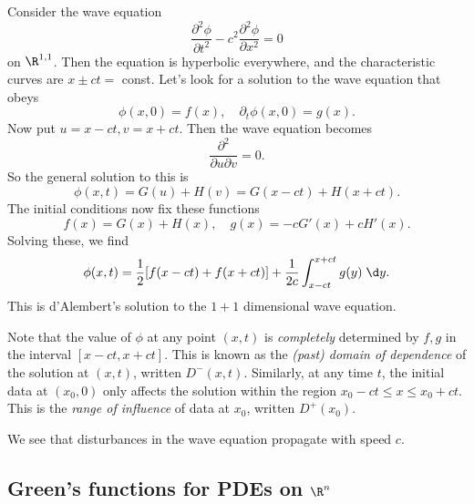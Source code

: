 \documentclass[a4paper]{article}
\begin{document}
\begin{eg}
  Consider the wave equation
  \[
    \frac{\partial^2 \phi}{\partial t^2} - c^2 \frac{\partial^2 \phi}{\partial x^2} = 0
  \]
  on $\R^{1, 1}$. Then the equation is hyperbolic everywhere, and the characteristic curves are $x \pm ct = $ const. Let's look for a solution to the wave equation that obeys
  \[
    \phi(x, 0) = f(x),\quad \partial_t \phi(x, 0) = g(x).
  \]
  Now put $u = x - ct, v = x + ct$. Then the wave equation becomes
  \[
    \frac{\partial^2}{\partial u \partial v} = 0.
  \]
  So the general solution to this is
  \[
    \phi(x, t) = G(u) + H(v) = G(x - ct) + H(x + ct).
  \]
  The initial conditions now fix these functions
  \[
    f(x) = G(x) + H(x),\quad g(x) = -c G'(x) + c H'(x).
  \]
  Solving these, we find
  \[
    \phi(x, t) = \frac{1}{2}[f(x - ct) + f(x + ct)] + \frac{1}{2c}\int_{x - ct}^{x + ct} g(y)\;\d y.
  \]
  This is d'Alembert's solution to the $1 + 1$ dimensional wave equation.
\end{eg}
Note that the value of $\phi$ at any point $(x, t)$ is \emph{completely} determined by $f, g$ in the interval $[x - ct, x + ct]$. This is known as the \emph{(past) domain of dependence} of the solution at $(x, t)$, written $D^-(x, t)$. Similarly, at any time $t$, the initial data at $(x_0, 0)$ only affects the solution within the region $x_0 - ct \leq x \leq x_0 + ct$. This is the \emph{range of influence} of data at $x_0$, written $D^+(x_0)$.
\begin{center}
\end{center}
We see that disturbances in the wave equation propagate with speed $c$.

\subsection{Green's functions for PDEs on \texorpdfstring{$\R^n$}{Rn}}
\end{document}
